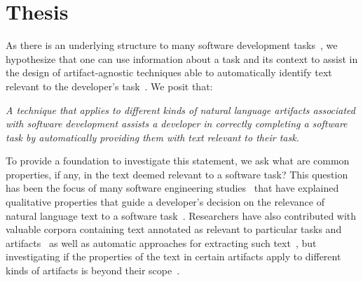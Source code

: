 

\section{Thesis}
\label{cp1:thesis}





As there is an underlying structure to many software development tasks~\cite{Murphy2005},
we hypothesize that one can use information about a task and its context to assist in 
the design of artifact-agnostic techniques able to  
automatically identify text relevant to the developer's task~\cite{Starke2009, Bavota2016}. We posit that:


\medskip
\begin{bluequote}
    \textit{A technique that applies to different kinds of natural language artifacts associated with software development assists a developer in correctly completing a software task by 
    automatically providing them with text relevant to their task.  }
\end{bluequote}



To provide a foundation to investigate this statement, we ask what are common properties, if any, in the text deemed relevant to a software task? This question has been the focus of many software engineering studies~\cite{Piorkowski2015, Piorkowski2016, chi2007, Ko2006a} that have explained qualitative properties that 
guide a developer's decision on the relevance of natural language text 
to a software task~\cite{Forward2002, BenCharrada2016, Starke2009, DeGraaf2014}.
Researchers have also contributed with valuable corpora
containing text annotated as relevant to particular tasks and artifacts~\cite{nadi2019Rep, Rastkar2010}
as well as automatic approaches for extracting such text~\cite{Chaparro2017, Robillard2015, Xu2017}, 
but investigating if  the properties 
of the text in certain artifacts apply to different kinds of artifacts
is beyond their scope~\cite{hutchinson2021, bird2009}.



